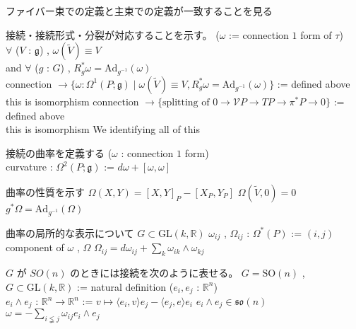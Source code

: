 \begin{Theorem}
\itemnote
  ファイバー束での定義と主束での定義が一致することを見る
\itemprop
  \WIP
\end{Theorem}

\begin{Theorem}
\itemnote
  接続・接続形式・分裂が対応することを示す。
\itemprop
  \For (\(\omega\) := connection \(1\) form of \(\tau\)) \\
  \Then \(\forall\) (\(V\) : \(\mathfrak{g}\)) , \(\omega(\tilde{V}) \equiv V\) \\
  and \(\forall\) (\(g\) : \(G\)) , \(R_g^* \omega = \text{Ad}_{g^{-1}}(\omega)\)
\itemprop
  \Let \(\text{connection } \to \{\omega : \Omega^1(P ; \mathfrak{g}) \mid \omega(\tilde{V}) \equiv V , R_g^* \omega = \text{Ad}_{g^{-1}}(\omega)\}\) := defined above \\
  \Then this is isomorphism
\itemprop
  \Let \(\text{connection } \to \{\text{splitting of } 0 \to \mathcal{V}P \to TP \to \pi^*P \to 0\}\) := defined above \\
  \Then this is isomorphism
\itemnote
  We identifying all of this
\end{Theorem}

\begin{Definition}
\itemnote
  接続の曲率を定義する
\itemdefi
  \For (\(\omega\) : connection \(1\) form) \\
  \Define curvature : \(\Omega^2(P ; \mathfrak{g})\) := \(d \omega + [\omega , \omega]\)
\end{Definition}

\begin{Theorem}
\itemnote
  曲率の性質を示す
\itemdefi
  \(\Omega(X , Y) = [X , Y]_P - [X_P , Y_P]\)
\itemdefi
  \(\Omega(\tilde{V} , 0) = 0\)
\itemdefi
  \(g^* \Omega = \text{Ad}_{g^{-1}}(\Omega)\)
\end{Theorem}

\begin{Theorem}
\itemnote
  曲率の局所的な表示について
\itemwhen
  \Fix \(G \subset \text{GL}(k , \mathbb{R})\)
\itemdefi
  \(\omega_{ij}\) , \(\Omega_{ij}\) : \(\Omega^*(P)\) := \((i,j)\) component of \(\omega\) , \(\Omega\)
\itemprop
  \(\Omega_{ij} = d \omega_{ij} + \sum_k \omega_{ik} \wedge \omega_{kj}\)
\end{Theorem}

\begin{Theorem}
\itemnote
  \(G\) が \(SO(n)\) のときには接続を次のように表せる。
\itemwhen
  \Fix \(G = \text{SO}(n)\) , \(G \subset \text{GL}(k , \mathbb{R})\) := natural definition
\itemdefi
  \For (\(e_i , e_j\) : \(\mathbb{R}^n\)) \\
  \Define \(e_i \wedge e_j\) : \(\mathbb{R}^n \to \mathbb{R}^n\) := \(v \mapsto \langle e_i , v \rangle e_j - \langle e_j , e \rangle e_i\)
\itemprop
  \(e_i \wedge e_j \in \mathfrak{so}(n)\)
\itemprop
  \(\omega = - \sum_{i \lneqq j} \omega_{ij} e_i \wedge e_j\)
\end{Theorem}

